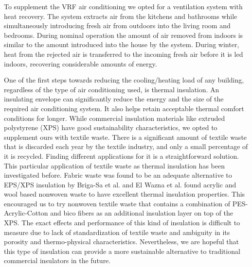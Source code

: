 \documentclass[justified]{tufte-book}
\begin{document}
\par To supplement the VRF air conditioning we opted for a ventilation system with heat recovery. The system extracts air from the kitchens and bathrooms while simultaneously introducing fresh air from outdoors into the living room and bedrooms. During nominal operation the amount of air removed from indoors is similar to the amount introduced into the house by the system. During winter, heat from the rejected air is transferred to the incoming fresh air before it is led indoors, recovering considerable amounts of energy.
\par    
One of the first steps towards reducing the cooling/heating load of any building, regardless of the type of air conditioning used, is thermal insulation. An insulating envelope can significantly reduce the energy and the size of the required air conditioning system. It also helps retain acceptable thermal comfort conditions for longer. While commercial insulation materials like extruded polystyrene (XPS) have good sustainability characteristics, we opted to supplement ours with textile waste. There is a significant amount of textile waste that is discarded each year by the textile industry, and only a small percentage of it is recycled. Finding different applications for it is a straightforward solution. This particular application of textile waste as thermal insulation has been investigated before. Fabric waste was found to be an adequate alternative to EPS/XPS insulation by Briga-Sa et al.\cite{briga2013textile} and El Wazna et al.\cite{el2017thermo} found acrylic and wool based nonwoven waste to have excellent thermal insulation properties. This encouraged us to try nonwoven textile waste that contains a combination of PES-Acrylic-Cotton and bico fibers as an additional insulation layer on top of the XPS. The exact effects and performance of this kind of insulation is difficult to measure due to lack of standardization of textile waste and ambiguity in its porosity and thermo-physical characteristics. Nevertheless, we are hopeful that this type of insulation can provide a more sustainable alternative to traditional commercial insulators in the future.\\
\end{document}
